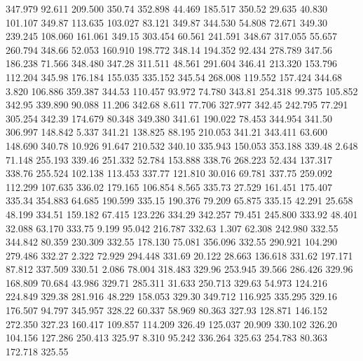  347.979   92.611  209.500       350.74
 352.898   44.469  185.517       350.52
  29.635   40.830  101.107       349.87
 113.635  103.027   83.121       349.87
 344.530   54.808   72.671       349.30
 239.245  108.060  161.061       349.15
 303.454   60.561  241.591       348.67
 317.055   55.657  260.794       348.66
  52.053  160.910  198.772       348.14
 194.352   92.434  278.789       347.56
 186.238   71.566  348.480       347.28
 311.511   48.561  291.604       346.41
 213.320  153.796  112.204       345.98
 176.184  155.035  335.152       345.54
 268.008  119.552  157.424       344.68
   3.820  106.886  359.387       344.53
 110.457   93.972   74.780       343.81
 254.318   99.375  105.852       342.95
 339.890   90.088   11.206       342.68
   8.611   77.706  327.977       342.45
 242.795   77.291  305.254       342.39
 174.679   80.348  349.380       341.61
 190.022   78.453  344.954       341.50
 306.997  148.842    5.337       341.21
 138.825   88.195  210.053       341.21
 343.411   63.600  148.690       340.78
  10.926   91.647  210.532       340.10
 335.943  150.053  353.188       339.48
   2.648   71.148  255.193       339.46
 251.332   52.784  153.888       338.76
 268.223   52.434  137.317       338.76
 255.524  102.138  113.453       337.77
 121.810   30.016   69.781       337.75
 259.092  112.299  107.635       336.02
 179.165  106.854    8.565       335.73
  27.529  161.451  175.407       335.34
 354.883   64.685  190.599       335.15
 190.376   79.209   65.875       335.15
  42.291   25.658   48.199       334.51
 159.182   67.415  123.226       334.29
 342.257   79.451  245.800       333.92
  48.401   32.088   63.170       333.75
   9.199   95.042  216.787       332.63
   1.307   62.308  242.980       332.55
 344.842   80.359  230.309       332.55
 178.130   75.081  356.096       332.55
 290.921  104.290  279.486       332.27
   2.322   72.929  294.448       331.69
  20.122   28.663  136.618       331.62
 197.171   87.812  337.509       330.51
   2.086   78.004  318.483       329.96
 253.945   39.566  286.426       329.96
 168.809   70.684   43.986       329.71
 285.311   31.633  250.713       329.63
  54.973  124.216  224.849       329.38
 281.916   48.229  158.053       329.30
 349.712  116.925  335.295       329.16
 176.507   94.797  345.957       328.22
  60.337   58.969   80.363       327.93
 128.871  146.152  272.350       327.23
 160.417  109.857  114.209       326.49
 125.037   20.909  330.102       326.20
 104.156  127.286  250.413       325.97
   8.310   95.242  336.264       325.63
 254.783   80.363  172.718       325.55
